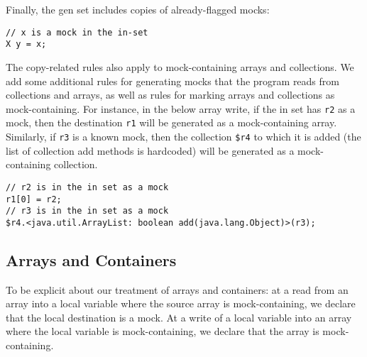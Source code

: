 Finally, the gen set includes copies of already-flagged mocks:
\begin{lstlisting}[basicstyle=\ttfamily\small,numbers=none]
// x is a mock in the in-set
X y = x;
\end{lstlisting}
The copy-related rules also apply to mock-containing arrays and collections. We add some additional rules for generating mocks that the program reads from collections and arrays, as well as rules for marking arrays and collections as mock-containing. For instance, in the below array write, if the in set has \texttt{r2} as a mock, then the destination \texttt{r1} will be generated as a mock-containing array. Similarly, if \texttt{r3} is a known mock, then the collection \texttt{\$r4} to which it is added (the list of collection add methods is hardcoded) will be generated as a mock-containing collection.
\begin{lstlisting}[basicstyle=\ttfamily\small,numbers=none]
// r2 is in the in set as a mock
r1[0] = r2;
// r3 is in the in set as a mock
$r4.<java.util.ArrayList: boolean add(java.lang.Object)>(r3);
\end{lstlisting}



\subsection{Arrays and Containers}

To be explicit about our treatment of arrays and containers: at a read from an array into a local variable where the source array is mock-containing, we declare that the local destination is a mock. At a write of a local variable into an array where the local variable is mock-containing, we declare that the array is mock-containing.



